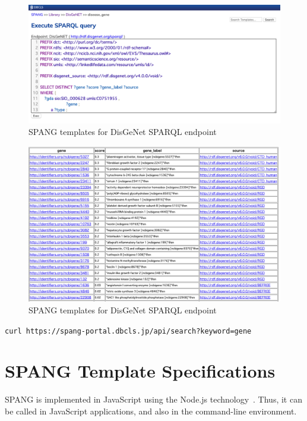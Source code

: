 \documentclass[runningheads]{llncs}
\begin{document}
\begin{figure}
\center
\includegraphics[width=1.0\textwidth]{spang_disease_gene_query.png}
\caption{SPANG templates for DisGeNet SPARQL endpoint}
\label{fig:spang_disease_gene_query}
\end{figure}

\begin{figure}
\center
\includegraphics[width=1.0\textwidth]{spang_disease_gene_result.png}
\caption{SPANG templates for DisGeNet SPARQL endpoint}
\label{fig:spang_disease_gene_result}
\end{figure}




\texttt{curl https://spang-portal.dbcls.jp/api/search?keyword=gene}


\section{SPANG Template Specifications}

SPANG is implemented in JavaScript using the Node.js technology~\cite{nodejs}. Thus, it can be called in JavaScript applications, and also in the command-line environment.
\end{document}

